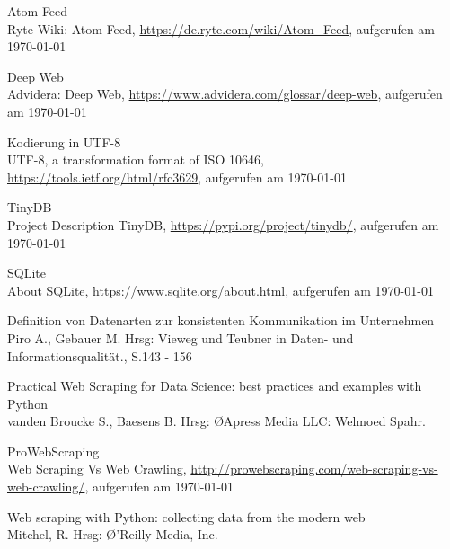 \documentclass[a4paper,oneside,12pt]{report}
\begin{document}
	
	
	\clearpage
	\begin{thebibliography}{9} 
		\vspace{1.0cm}
		
		 Atom Feed\\ Ryte Wiki: Atom Feed, \newline \url{https://de.ryte.com/wiki/Atom_Feed}, aufgerufen am \today
					
		 Deep Web\\ Advidera: Deep Web, \newline \url{https://www.advidera.com/glossar/deep-web}, aufgerufen am \today	
		
		 Kodierung in UTF-8\\ UTF-8, a transformation format of ISO 10646, \newline \url{https://tools.ietf.org/html/rfc3629}, aufgerufen am \today
		
		 TinyDB\\ Project Description TinyDB, \newline \url{https://pypi.org/project/tinydb/}, aufgerufen am \today
		
		 SQLite\\ About SQLite, \newline \url{https://www.sqlite.org/about.html}, aufgerufen am \today
		
		 Definition von Datenarten zur konsistenten Kommunikation im Unternehmen\\ Piro A., Gebauer M. Hrsg: \glqq Vieweg und Teubner in Daten- und Informationsqualität.\grqq, S.143 - 156
		
		 Practical Web Scraping for Data Science: best practices and examples with Python\\ vanden Broucke S., Baesens B. Hrsg: \O Apress Media LLC: Welmoed Spahr.\grqq
		
		 ProWebScraping\\ Web Scraping Vs Web Crawling, \newline \url{http://prowebscraping.com/web-scraping-vs-web-crawling/}, aufgerufen am \today
		
		 Web scraping with Python: collecting data from the modern web\\ Mitchel, R. Hrsg: \O'Reilly Media, Inc.
		

\end{thebibliography}
\end{document}
